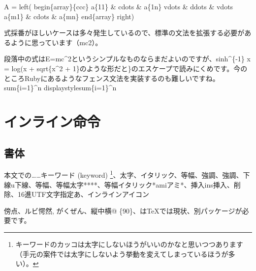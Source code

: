 \textdollar{}\textdollar{} A = \reviewbackslash{}left( \reviewbackslash{}begin\{array\}\{ccc\} a\textunderscore{}\{11\} \& \reviewbackslash{}cdots \& a\textunderscore{}\{1n\} \reviewbackslash{} \reviewbackslash{}vdots \& \reviewbackslash{}ddots \& \reviewbackslash{}vdots \reviewbackslash{} a\textunderscore{}\{m1\} \& \reviewbackslash{}cdots \& a\textunderscore{}\{mn\} \reviewbackslash{}end\{array\} \reviewbackslash{}right) \textdollar{}\textdollar{}

式採番がほしいケースは多々発生しているので、標準の文法を拡張する必要があるように思っています（mc2）。

段落中の式は\textdollar{}\textdollar{}E=mc\textasciicircum{}2\textdollar{}\textdollar{}というシンプルなものならまだよいのですが、\textdollar{}\textdollar{}\reviewbackslash{}sinh\textasciicircum{}\{{-}1\} x = \reviewbackslash{}log(x + \reviewbackslash{}sqrt\{x\textasciicircum{}2 + 1\}\textdollar{}\textdollar{}のような形だと\}のエスケープで読みにくめです。今のところRubyにあるようなフェンス文法を実装するのも難しいですね。\textdollar{}\textdollar{}\reviewbackslash{}sum\textunderscore{}\{i=1\}\textasciicircum{}n\textdollar{}\textdollar{} \textdollar{}\textdollar{}\reviewbackslash{}displaystyle\reviewbackslash{}sum\textunderscore{}\{i=1\}\textasciicircum{}n\textdollar{}\textdollar{}

\section{インライン命令}
\label{sec:2-4}



\subsection{書体}
\label{sec:2-4-1}

本文での……キーワード (keyword) \footnote{キーワードのカッコは太字にしないほうがいいのかなと思いつつあります（手元の案件では太字にしないよう挙動を変えてしまっているほうが多い）。}、太字、イタリック、等幅、強調、強調、下線u下線、等幅、等幅太字****、等幅イタリック*amiアミ*、挿入ins挿入、削除、16進UTF文字指定あ、インラインアイコン

傍点、ルビ愕然, がくぜん、縦中横@ \{90\}、はTeXでは現状、別パッケージが必要です。


